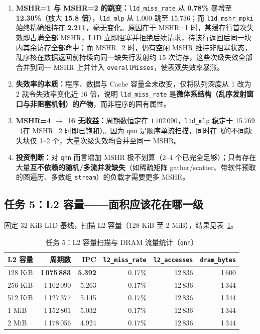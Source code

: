 \documentclass[12pt,a4paper,fontset=mac]{ctexart}
\begin{document}
\begin{enumerate}
  \item \textbf{MSHR=1 与 MSHR=2 的跳变：}\texttt{l1d\_miss\_rate} 从 \textbf{0.78\%} 暴增至 \textbf{12.30\%}（放大 \textbf{15.8 倍}），\texttt{l1d\_mlp} 从 1.000 跳至 15.736；而 \texttt{l1d\_mshr\_mpki} 始终精确维持在 \textbf{2.211}，毫无变化。原因在于 MSHR=1 时，某缓存行首次失效即占满全部 MSHR，L1D 立即阻塞并拒绝后续请求，待该行返回后同一块内其余访存全部命中；而 MSHR=2 时，仍有空闲 MSHR 维持非阻塞状态，乱序核在数据返回前持续向同一缺失行发射约 15 次访存，这些次级失效全部合并到同一 MSHR 上并计入 \texttt{overallMisses}，使表观失效率暴涨。
  \item \textbf{失效率的本质：}程序、数据与 Cache 容量全未改变，仅将队列深度从 1 改为 2 就令失效率变化近 16 倍，说明 \texttt{l1d\_miss\_rate} 是\textbf{微体系结构（乱序发射窗口与非阻塞机制）的产物}，而非程序的固有属性。
  \item \textbf{MSHR=4 $\to$ 16 无收益：}周期数恒定在 $1\,102\,090$，\texttt{l1d\_mlp} 稳定于 15.769（在 MSHR=2 时即已饱和）。因为 \texttt{qnn} 是顺序单流扫描，同时在飞的不同缺失块仅 1--2 个，大量次级失效均合并至同一 MSHR。
  \item \textbf{投资判断：}对 \texttt{qnn} 而言增加 MSHR 极不划算（2--4 个已完全足够）；只有存在大量\textbf{互不依赖的随机/多流并发缺失}（如稀疏矩阵 gather/scatter、带软件预取的图遍历、多数组 \texttt{stream}）的负载才需要更多 MSHR。
\end{enumerate}

\subsection{任务 5：L2 容量——面积应该花在哪一级}
固定 32 KiB L1D 基线，扫描 L2 容量（128 KiB 至 2 MiB），结果见表~\ref{tab:task5}。

\begin{table}[H]\centering\small
\caption{任务 5：L2 容量扫描与 DRAM 流量统计（\texttt{qnn}）}\label{tab:task5}
\begin{tabular}{lrrrrr}\toprule
L2 容量 & 周期数 & IPC & \texttt{l2\_miss\_rate} & \texttt{l2\_accesses} & \texttt{dram\_bytes} \\\midrule
128 KiB & \textbf{1\,075\,883} & \textbf{5.392} & 0.17\% & 12\,836 & 1\,600 \\
256 KiB & 1\,102\,090 & 5.263 & 0.17\% & 12\,836 & 1\,344 \\
512 KiB & 1\,127\,377 & 5.145 & 0.17\% & 12\,836 & 1\,344 \\
1 MiB   & 1\,152\,801 & 5.032 & 0.17\% & 12\,836 & 1\,344 \\
2 MiB   & 1\,178\,056 & 4.924 & 0.17\% & 12\,836 & 1\,344 \\
\bottomrule\end{tabular}
\end{table}
\end{document}
